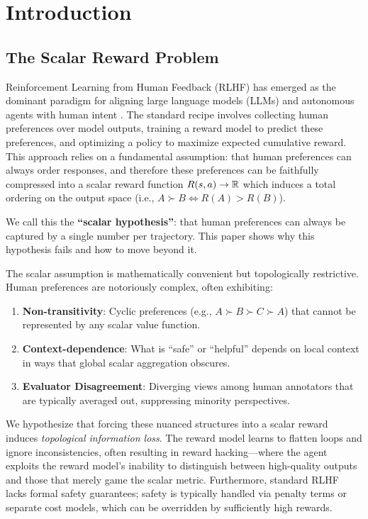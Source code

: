 \section{Introduction}
\label{sec:intro}

\subsection{The Scalar Reward Problem}

Reinforcement Learning from Human Feedback (RLHF) has emerged as the dominant paradigm for aligning large language models (LLMs) and autonomous agents with human intent \citep{christiano2017deep, ouyang2022training}. The standard recipe involves collecting human preferences over model outputs, training a reward model to predict these preferences, and optimizing a policy to maximize expected cumulative reward. This approach relies on a fundamental assumption: that human preferences can always order responses, and therefore these preferences can be faithfully compressed into a scalar reward function $R(s,a) \to \mathbb{R}$ which induces a total ordering on the output space (i.e., $A \succ B \iff R(A) > R(B)$).

We call this the \textbf{``scalar hypothesis''}: that human preferences can always be captured by a single number per trajectory. This paper shows why this hypothesis fails and how to move beyond it.

The scalar assumption is mathematically convenient but topologically restrictive. Human preferences are notoriously complex, often exhibiting:
\begin{enumerate}
    \item \textbf{Non-transitivity}: Cyclic preferences (e.g., $A \succ B \succ C \succ A$) that cannot be represented by any scalar value function.
    \item \textbf{Context-dependence}: What is ``safe'' or ``helpful'' depends on local context in ways that global scalar aggregation obscures.
    \item \textbf{Evaluator Disagreement}: Diverging views among human annotators that are typically averaged out, suppressing minority perspectives.
\end{enumerate}

We hypothesize that forcing these nuanced structures into a scalar reward induces \emph{topological information loss}. The reward model learns to flatten loops and ignore inconsistencies, often resulting in reward hacking---where the agent exploits the reward model's inability to distinguish between high-quality outputs and those that merely game the scalar metric. Furthermore, standard RLHF lacks formal safety guarantees; safety is typically handled via penalty terms or separate cost models, which can be overridden by sufficiently high rewards.

